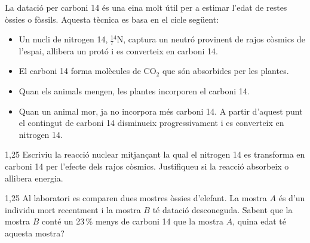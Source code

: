 La datació per carboni 14 és una eina molt útil per a estimar l'edat de restes òssies o fòssils. Aquesta tècnica es basa en el cicle següent:
\begin{itemize}[label={---},itemsep=0pt]
  \item Un nucli de nitrogen 14, $^{14}_{7}\mathrm{N}$, captura un neutró provinent de rajos còsmics de l'espai, allibera un protó i es converteix en carboni 14.
  \item El carboni 14 forma molècules de $\mathrm{CO_2}$ que són absorbides per les plantes.
  \item Quan els animals mengen, les plantes incorporen el carboni 14.
  \item Quan un animal mor, ja no incorpora més carboni 14. A partir d'aquest punt el contingut de carboni 14 disminueix progressivament i es converteix en nitrogen 14.
\end{itemize}

\begin{apartat}{1,25}
Escriviu la reacció nuclear mitjançant la qual el nitrogen 14 es transforma en carboni 14 per l'efecte dels rajos còsmics. Justifiqueu si la reacció absorbeix o allibera energia.
\end{apartat}

\begin{apartat}{1,25}
Al laboratori es comparen dues mostres òssies d'elefant. La mostra $A$ és d'un individu mort recentment i la mostra $B$ té datació desconeguda. Sabent que la mostra $B$ conté un 23\,\% menys de carboni 14 que la mostra $A$, quina edat té aquesta mostra?
\end{apartat}

